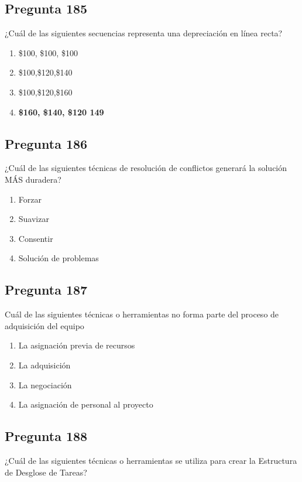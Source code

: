 \documentclass[11pt,a4paper]{article}
\begin{document}
\subsection*{Pregunta 185}
¿Cuál de las siguientes secuencias representa una depreciación en línea recta?

\begin{enumerate}[label=\alph*)]
  \item \$100, \$100, \$100
  \item \$100,\$120,\$140
  \item \$100,\$120,\$160
  \item \textbf{\$160, \$140, \$120 149}
\end{enumerate}

\subsection*{Pregunta 186}
¿Cuál de las siguientes técnicas de resolución de conflictos generará la solución MÁS duradera?

\begin{enumerate}[label=\alph*)]
  \item Forzar
  \item Suavizar
  \item Consentir
  \item Solución de problemas
\end{enumerate}

\subsection*{Pregunta 187}
Cuál de las siguientes técnicas o herramientas no forma parte del proceso de adquisición del equipo

\begin{enumerate}[label=\alph*)]
  \item La asignación previa de recursos
  \item La adquisición
  \item La negociación
  \item La asignación de personal al proyecto
\end{enumerate}

\subsection*{Pregunta 188}
¿Cuál de las siguientes técnicas o herramientas se utiliza para crear la Estructura de Desglose de Tareas?
\end{document}
